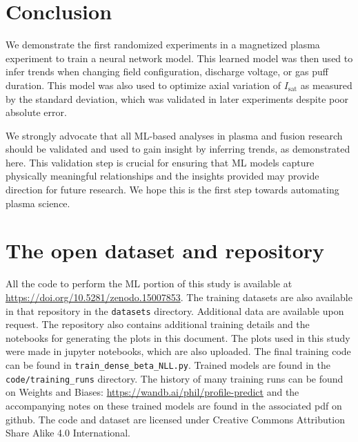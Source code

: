 \section{Conclusion}
\label{sec:isat-predict_conclusion}

We demonstrate the first randomized experiments in a magnetized plasma experiment to train a neural network model. This learned model was then used to infer trends when changing field configuration, discharge voltage, or gas puff duration. This model was also used to optimize axial variation of $I_\text{sat}$ as measured by the standard deviation, which was validated in later experiments despite poor absolute error. 

We strongly advocate that all ML-based analyses in plasma and fusion research should be validated  and used to gain insight by inferring trends, as demonstrated here. This validation step is crucial for ensuring that ML models capture physically meaningful relationships and the insights provided may provide direction for future research. We hope this is the first step towards automating plasma science.





\section{The open dataset and repository} 
\label{app:repo}
All the code to perform the ML portion of this study is available at \url{https://doi.org/10.5281/zenodo.15007853}. The training datasets are also available in that repository in the \texttt{datasets} directory. Additional data are available upon request. The repository also contains additional training details and the notebooks for generating the plots in this document. 
The plots used in this study were made in jupyter notebooks, which are also uploaded. The final training code can be found in \texttt{train\_dense\_beta\_NLL.py}. Trained models are found in the \texttt{code/training\_runs} directory.
The history of many training runs can be found on Weights and Biases: \url{https://wandb.ai/phil/profile-predict} and the accompanying notes on these trained models are found in the associated pdf on github.
The code and dataset are licensed under Creative Commons Attribution Share Alike 4.0 International. 
